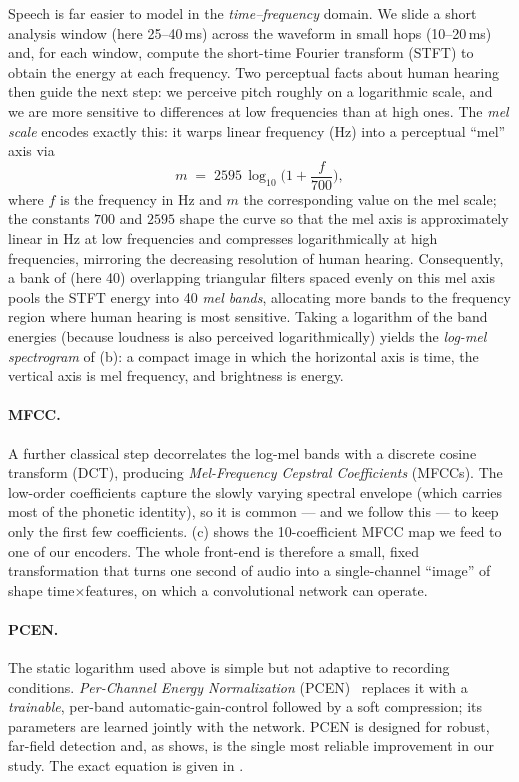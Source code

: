 \documentclass[12pt,a4paper]{report}
\begin{document}
Speech is far easier to model in the \emph{time--frequency} domain. We slide a
short analysis window (here 25--40\,ms) across the waveform in small hops
(10--20\,ms) and, for each window, compute the short-time Fourier transform
(STFT) to obtain the energy at each frequency. Two perceptual facts about human
hearing then guide the next step: we perceive pitch roughly on a logarithmic
scale, and we are more sensitive to differences at low frequencies than at high
ones. The \emph{mel scale} encodes exactly this: it warps linear frequency (Hz)
into a perceptual ``mel'' axis via
\begin{equation}
m \;=\; 2595\,\log_{10}\!\Big(1+\frac{f}{700}\Big),
\label{eq:mel}
\end{equation}
where $f$ is the frequency in Hz and $m$ the corresponding value on the mel
scale; the constants $700$ and $2595$ shape the curve so that the mel axis is
approximately linear in Hz at low frequencies and compresses logarithmically at
high frequencies, mirroring the decreasing resolution of human hearing.
Consequently, a bank of (here 40) overlapping triangular filters spaced evenly on
this mel axis pools the STFT energy into 40 \emph{mel bands}, allocating more
bands to the frequency region where human hearing is most sensitive. Taking a
logarithm of the band energies (because loudness is also perceived
logarithmically) yields the \emph{log-mel spectrogram} of
(b): a compact image in which the horizontal axis is time,
the vertical axis is mel frequency, and brightness is energy.

\paragraph{MFCC.}
A further classical step decorrelates the log-mel bands with a discrete cosine
transform (DCT), producing \emph{Mel-Frequency Cepstral Coefficients} (MFCCs).
The low-order coefficients capture the slowly varying spectral envelope (which
carries most of the phonetic identity), so it is common --- and we follow this ---
to keep only the first few coefficients. (c) shows the
10-coefficient MFCC map we feed to one of our encoders. The whole front-end is
therefore a small, fixed transformation that turns one second of audio into a
single-channel ``image'' of shape time$\times$features, on which a convolutional
network can operate.

\paragraph{PCEN.}
The static logarithm used above is simple but not adaptive to recording
conditions. \emph{Per-Channel Energy Normalization} (PCEN)~\cite{wang2017trainable}
replaces it with a \emph{trainable}, per-band automatic-gain-control followed by a
soft compression; its parameters are learned jointly with the network. PCEN is
designed for robust, far-field detection and, as  shows, is the
single most reliable improvement in our study. The exact equation is given in
.
\end{document}
